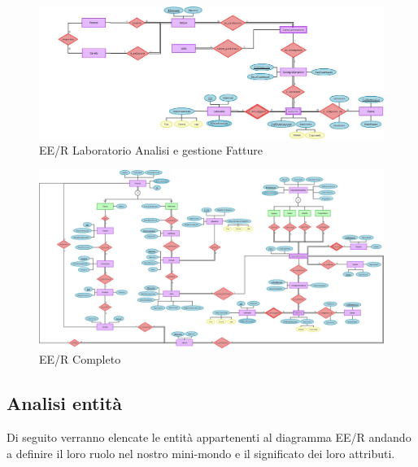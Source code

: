 \documentclass[12pt]{report}
\begin{document}
\begin{figure}[H]
\centering
\includegraphics[scale=0.45,angle=90]{imgs/eer_LabAnalisi.jpeg}
\caption{EE/R Laboratorio Analisi e gestione Fatture}
\end{figure}

\begin{figure}[H]
\centering
\includegraphics[scale=0.33,angle=90]{imgs/eer_completo.jpeg}
\caption{EE/R Completo}
\end{figure}




\subsection{Analisi entità}
Di seguito verranno elencate le entità appartenenti al diagramma EE/R andando a definire il loro ruolo nel nostro mini-mondo e il significato dei loro attributi.
\end{document}
